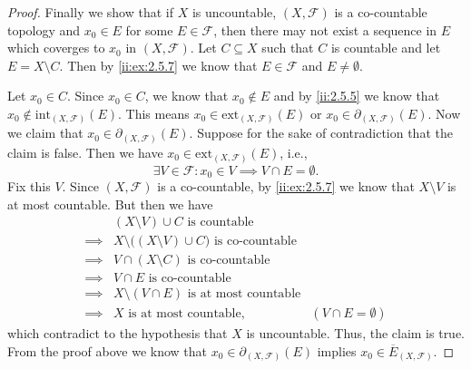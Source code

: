\begin{proof}
  Finally we show that if \(X\) is uncountable, \((X, \mathcal{F})\) is a co-countable topology and \(x_0 \in E\) for some \(E \in \mathcal{F}\), then there may not exist a sequence in \(E\) which coverges to \(x_0\) in \((X, \mathcal{F})\).
  Let \(C \subseteq X\) such that \(C\) is countable and let \(E = X \setminus C\).
  Then by \cref{ii:ex:2.5.7} we know that \(E \in \mathcal{F}\) and \(E \neq \emptyset\).

  Let \(x_0 \in C\).
  Since \(x_0 \in C\), we know that \(x_0 \notin E\) and by \cref{ii:2.5.5} we know that \(x_0 \notin \text{int}_{(X, \mathcal{F})}(E)\).
  This means \(x_0 \in \text{ext}_{(X, \mathcal{F})}(E)\) or \(x_0 \in \partial_{(X, \mathcal{F})}(E)\).
  Now we claim that \(x_0 \in \partial_{(X, \mathcal{F})}(E)\).
  Suppose for the sake of contradiction that the claim is false.
  Then we have \(x_0 \in \text{ext}_{(X, \mathcal{F})}(E)\), i.e.,
  \[
    \exists V \in \mathcal{F} : x_0 \in V \implies V \cap E = \emptyset.
  \]
  Fix this \(V\).
  Since \((X, \mathcal{F})\) is a co-countable, by \cref{ii:ex:2.5.7} we know that \(X \setminus V\) is at most countable.
  But then we have
  \begin{align*}
             & (X \setminus V) \cup C \text{ is countable}                                                   \\
    \implies & X \setminus \big((X \setminus V) \cup C\big) \text{ is co-countable}                          \\
    \implies & V \cap (X \setminus C) \text{ is co-countable}                                                \\
    \implies & V \cap E \text{ is co-countable}                                                              \\
    \implies & X \setminus (V \cap E) \text{ is at most countable}                                           \\
    \implies & X \text{ is at most countable},                                      & (V \cap E = \emptyset)
  \end{align*}
  which contradict to the hypothesis that \(X\) is uncountable.
  Thus, the claim is true.
  From the proof above we know that \(x_0 \in \partial_{(X, \mathcal{F})}(E)\) implies \(x_0 \in \overline{E}_{(X, \mathcal{F})}\).


\end{proof}
